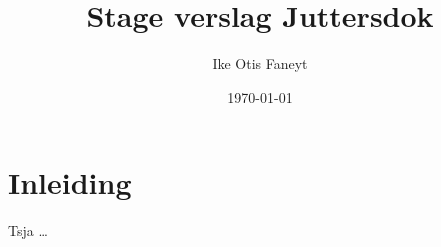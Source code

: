 \documentclass[12pt]{article}
\begin{document}
\title{Stage verslag Juttersdok}
\author{Ike Otis Faneyt}
\date{\today}
\maketitle
{}

\section{Inleiding}
Tsja \ldots{}
\end{document}
